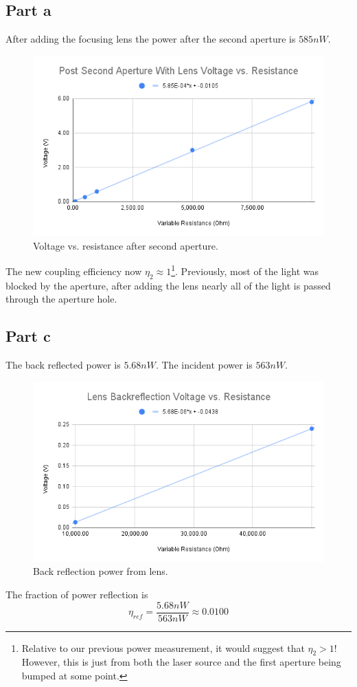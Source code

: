 \subsection*{Part a}
After adding the focusing lens the power after the second aperture is $585nW$.
\begin{figure}[h]
    \centering
    \includegraphics[width=0.75\linewidth]{Resources//180Q//Homework 2/Post Second Aperture With Lens Voltage vs. Resistance.png}
    \caption{Voltage vs. resistance after second aperture.}
    \label{fig:enter-label}
\end{figure}

The new coupling efficiency now $\eta_2 \approx 1$\footnote{Relative to our previous power measurement, it would suggest that $\eta_2 > 1$! However, this is just from both the laser source and the first aperture being bumped at some point.}. Previously, most of the light was blocked by the aperture, after adding the lens nearly all of the light is passed through the aperture hole.

\pagebreak
\subsection*{Part c}
The back reflected power is $5.68nW$. The incident power is $563nW$.
\begin{figure}[h]
    \centering
    \includegraphics[width=0.75\linewidth]{Resources//180Q//Homework 2/Lens Backreflection Voltage vs. Resistance.png}
    \caption{Back reflection power from lens.}
    \label{fig:enter-label}
\end{figure}
The fraction of power reflection is
$$
\eta_{ref} = \frac{5.68nW}{563nW} \approx 0.0100
$$

